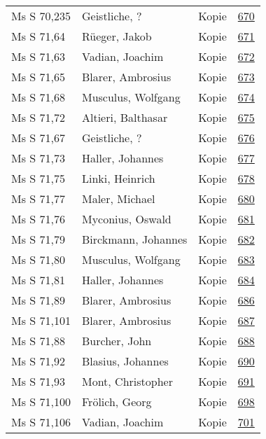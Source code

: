 \documentclass[10pt,a4paper,landscape]{report}
\begin{document}
\begin{longtable}{p{16cm}p{4cm}lr}
Ms S 70,235	&	Geistliche, ?	&	Kopie	&	\href{http://130.60.24.72/assignment/670}{670}\\
Ms S 71,64	&	Rüeger, Jakob	&	Kopie	&	\href{http://130.60.24.72/assignment/671}{671}\\
Ms S 71,63	&	Vadian, Joachim	&	Kopie	&	\href{http://130.60.24.72/assignment/672}{672}\\
Ms S 71,65	&	Blarer, Ambrosius	&	Kopie	&	\href{http://130.60.24.72/assignment/673}{673}\\
Ms S 71,68	&	Musculus, Wolfgang	&	Kopie	&	\href{http://130.60.24.72/assignment/674}{674}\\
Ms S 71,72	&	Altieri, Balthasar	&	Kopie	&	\href{http://130.60.24.72/assignment/675}{675}\\
Ms S 71,67	&	Geistliche, ?	&	Kopie	&	\href{http://130.60.24.72/assignment/676}{676}\\
Ms S 71,73	&	Haller, Johannes	&	Kopie	&	\href{http://130.60.24.72/assignment/677}{677}\\
Ms S 71,75	&	Linki, Heinrich	&	Kopie	&	\href{http://130.60.24.72/assignment/678}{678}\\
Ms S 71,77	&	Maler, Michael	&	Kopie	&	\href{http://130.60.24.72/assignment/680}{680}\\
Ms S 71,76	&	Myconius, Oswald	&	Kopie	&	\href{http://130.60.24.72/assignment/681}{681}\\
Ms S 71,79	&	Birckmann, Johannes	&	Kopie	&	\href{http://130.60.24.72/assignment/682}{682}\\
Ms S 71,80	&	Musculus, Wolfgang	&	Kopie	&	\href{http://130.60.24.72/assignment/683}{683}\\
Ms S 71,81	&	Haller, Johannes	&	Kopie	&	\href{http://130.60.24.72/assignment/684}{684}\\
Ms S 71,89	&	Blarer, Ambrosius	&	Kopie	&	\href{http://130.60.24.72/assignment/686}{686}\\
Ms S 71,101	&	Blarer, Ambrosius	&	Kopie	&	\href{http://130.60.24.72/assignment/687}{687}\\
Ms S 71,88	&	Burcher, John	&	Kopie	&	\href{http://130.60.24.72/assignment/688}{688}\\
Ms S 71,92	&	Blasius, Johannes	&	Kopie	&	\href{http://130.60.24.72/assignment/690}{690}\\
Ms S 71,93	&	Mont, Christopher	&	Kopie	&	\href{http://130.60.24.72/assignment/691}{691}\\
Ms S 71,100	&	Frölich, Georg	&	Kopie	&	\href{http://130.60.24.72/assignment/698}{698}\\
Ms S 71,106	&	Vadian, Joachim	&	Kopie	&	\href{http://130.60.24.72/assignment/701}{701}\\

\end{longtable}
\end{document}
